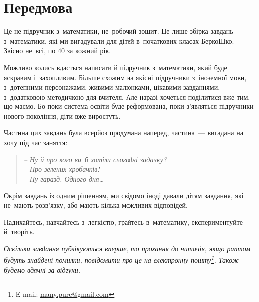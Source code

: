 \chapter*{Передмова}

Це не підручник з~математики, не~робочий зошит.
Це лише збірка завдань з~математики, які ми вигадували для дітей
в~початкових класах БеркоШко.
Звісно не~всі, по 40 за кожний рік.

Можливо колись вдасться написати й підручник з~математики,
який буде яскравим і~захопливим.
Більше схожим на якісні підручники з~іноземної мови, з~дотепними персонажами,
живими малюнками, цікавими завданнями, з~додатковою методичкою для вчителя.
Але наразі хочеться поділитися вже тим, що маємо.
Бо поки система освіти буде реформована, поки з’являться підручники
нового покоління, діти вже виростуть.

Частина цих завдань була всерйоз продумана наперед,
частина~--- вигадана на хочу під час заняття:
\begin{quote}
\itshape
-- Ну й про кого ви~б хотіли сьогодні задачку? \\
-- Про зелених хробачків! \\
-- Ну гаразд. Одного дня\ldots
\end{quote}

Окрім завдань із одним рішенням, ми свідомо іноді давали дітям завдання,
які не~мають розв’язку, або мають кілька можливих відповідей.

Надихайтесь, навчайтесь з~легкістю, грайтесь в~математику,
експериментуйте й~творіть. \smiley

\medskip
\medskip

\emph{\small
Оскільки завдання публікуються вперше, то прохання до читачів,
якщо раптом будуть знайдені помилки,
повідомити про це на електронну пошту\footnote{
    E-mail: \href{mailto:many.pure@gmail.com}{many.pure@gmail.com}
}. Також будемо вдячні за відгуки.
}%
\smiley
